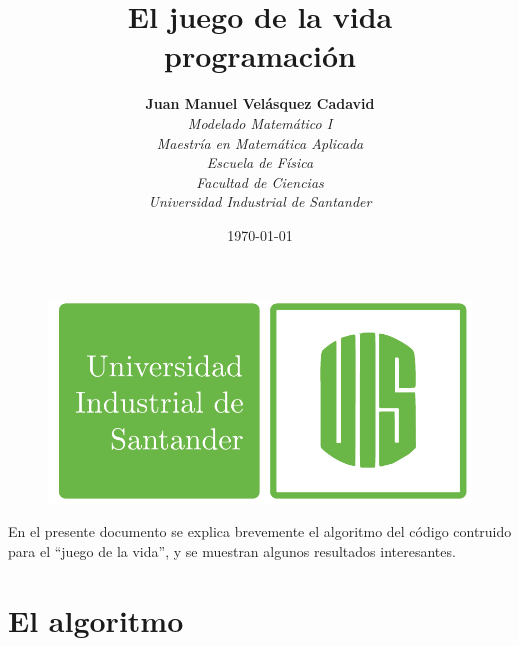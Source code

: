 \documentclass[11pt]{diazessay} %
\title{\textbf{El juego de la vida} \\ {programación}} %
\author{\textbf{Juan Manuel Velásquez Cadavid} 
\\
\textit{Modelado Matemático I}
\\ 
\textit{Maestría en Matemática Aplicada}
\\
\textit{Escuela de Física}
\\
\textit{Facultad de Ciencias}
\\ 
\textit{Universidad Industrial de Santander}} %
\date{\today} %
\begin{document}
\begin{figure}[h!]
\includegraphics[scale=0.35]{Figures/uis}
\end{figure}

\maketitle %

En el presente documento se explica brevemente el algoritmo del código contruido para el ``juego de la vida'', y se muestran algunos resultados interesantes. 

\section{El algoritmo}
\end{document}
